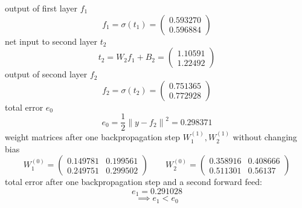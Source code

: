 \documentclass[a4paper,fleqn]{article}
\begin{document}
  output of first layer $f_1$
  \[
    f_1 = \sigma (t_1) =
    \begin{pmatrix}
      0.593270 \\ 0.596884
    \end{pmatrix}
  \]
  net input to second layer $t_2$
  \[
    t_2 = W_2 f_1 + B_2 =
    \begin{pmatrix}
      1.10591 \\ 1.22492
    \end{pmatrix}
  \]
  output of second layer $f_2$
  \[
    f_2 = \sigma (t_2) =
    \begin{pmatrix}
      0.751365 \\ 0.772928
    \end{pmatrix}
  \]
  total error $e_0$
  \[
    e_0 = \frac{1}{2} \left\| y - f_2 \right\|^2 = 0.298371
  \]
  weight matrices after one backpropagation step $W^{(1)}_1, W^{(1)}_2$ without changing bias
  \[
    W^{(0)}_1 =
    \begin{pmatrix}
      0.149781 & 0.199561 \\
      0.249751 & 0.299502
    \end{pmatrix}
    \qquad
    W^{(0)}_2 =
    \begin{pmatrix}
      0.358916 & 0.408666 \\
      0.511301 & 0.56137
    \end{pmatrix}
  \]
  total error after one backpropagation step and a second forward feed:
  \[
    e_1 = 0.291028
  \]
  \[
    \implies e_1 < e_0
  \]
\end{document}
